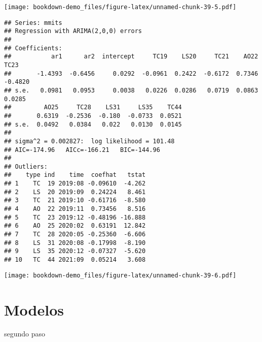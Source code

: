 \documentclass[
]{book}
\newenvironment{Shaded}{\begin{snugshade}}{\end{snugshade}}
\newcommand{\CommentTok}[1]{\textcolor[rgb]{0.56,0.35,0.01}{\textit{#1}}}
\begin{document}
\texttt{[image: bookdown-demo\_files/figure-latex/unnamed-chunk-39-5.pdf]}

\begin{verbatim}
## Series: mmits 
## Regression with ARIMA(2,0,0) errors 
## 
## Coefficients:
##           ar1      ar2  intercept     TC19    LS20     TC21    AO22     TC23
##       -1.4393  -0.6456     0.0292  -0.0961  0.2422  -0.6172  0.7346  -0.4820
## s.e.   0.0981   0.0953     0.0038   0.0226  0.0286   0.0719  0.0863   0.0285
##         AO25     TC28    LS31     LS35    TC44
##       0.6319  -0.2536  -0.180  -0.0733  0.0521
## s.e.  0.0492   0.0384   0.022   0.0130  0.0145
## 
## sigma^2 = 0.002827:  log likelihood = 101.48
## AIC=-174.96   AICc=-166.21   BIC=-144.96
## 
## Outliers:
##    type ind    time  coefhat   tstat
## 1    TC  19 2019:08 -0.09610  -4.262
## 2    LS  20 2019:09  0.24224   8.461
## 3    TC  21 2019:10 -0.61716  -8.580
## 4    AO  22 2019:11  0.73456   8.516
## 5    TC  23 2019:12 -0.48196 -16.888
## 6    AO  25 2020:02  0.63191  12.842
## 7    TC  28 2020:05 -0.25360  -6.606
## 8    LS  31 2020:08 -0.17998  -8.190
## 9    LS  35 2020:12 -0.07327  -5.620
## 10   TC  44 2021:09  0.05214   3.608
\end{verbatim}

\texttt{[image: bookdown-demo\_files/figure-latex/unnamed-chunk-39-6.pdf]}

\hypertarget{modelos-1}{%
\section{Modelos}\label{modelos-1}}

segundo paso

\begin{Shaded}
\end{Shaded}


  
\end{document}
